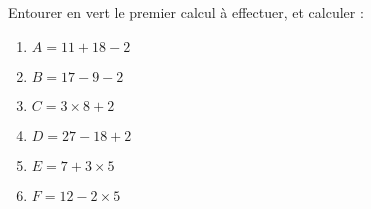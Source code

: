 
\begin{exercice}\label{exosmath-0728}

    Entourer en vert le premier calcul à effectuer, et calculer :
    \begin{multicols}{2}
        \begin{enumerate}
\item
$A = 11 + 18 - 2$
\item
$B = 17 - 9 - 2$
\item
$C = 3 × 8 + 2$
\item
$D = 27 - 18 + 2$
\item
$E = 7 + 3 × 5$
\item
$F = 12 - 2 × 5$
        \end{enumerate}
    \end{multicols}

\end{exercice}
